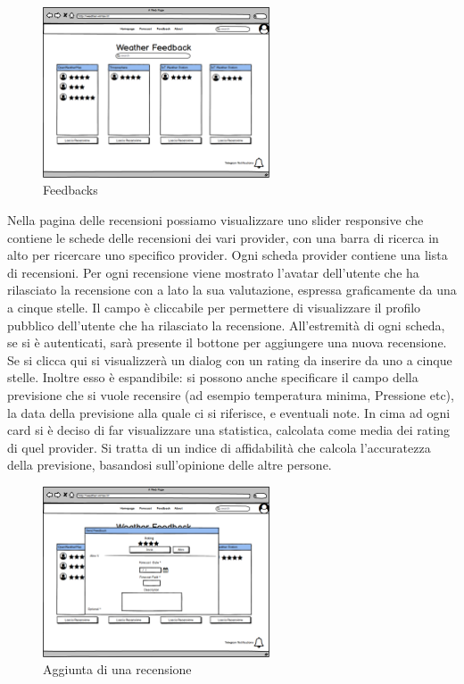 \begin{figure}[H]
    \caption{Feedbacks}
    \label{fig:Feedbacks}
    \centering
    \includegraphics[width=0.6\textwidth]{MockUps/feedback.png}
\end{figure}
Nella pagina delle recensioni possiamo visualizzare uno slider responsive che contiene le schede delle recensioni dei vari provider, con una barra di ricerca in alto per ricercare uno specifico provider.
Ogni scheda provider contiene una lista di recensioni. Per ogni recensione viene mostrato l'avatar dell'utente che ha rilasciato la recensione con a lato la sua valutazione, espressa graficamente da una a cinque stelle. Il campo è cliccabile per permettere di visualizzare il profilo pubblico dell'utente che ha rilasciato la recensione. All'estremità di ogni scheda, se si è autenticati, sarà presente il bottone per aggiungere una nuova recensione. Se si clicca qui si visualizzerà un dialog con un rating da inserire da uno a cinque stelle. Inoltre esso è espandibile: si possono anche specificare il campo della previsione che si vuole recensire (ad esempio temperatura minima, Pressione etc), la data della previsione alla quale ci si riferisce, e eventuali note.
In cima ad ogni card si è deciso di far visualizzare una statistica, calcolata come media dei rating di quel provider. Si tratta di un indice di affidabilità che calcola l'accuratezza della previsione, basandosi sull'opinione delle altre persone.\\



\begin{figure}[H]
    \caption{Aggiunta di una recensione}
    \label{fig:FeedbacksDialog}
    \centering
    \includegraphics[width=0.6\textwidth]{MockUps/sendFeedback.png}
\end{figure}

